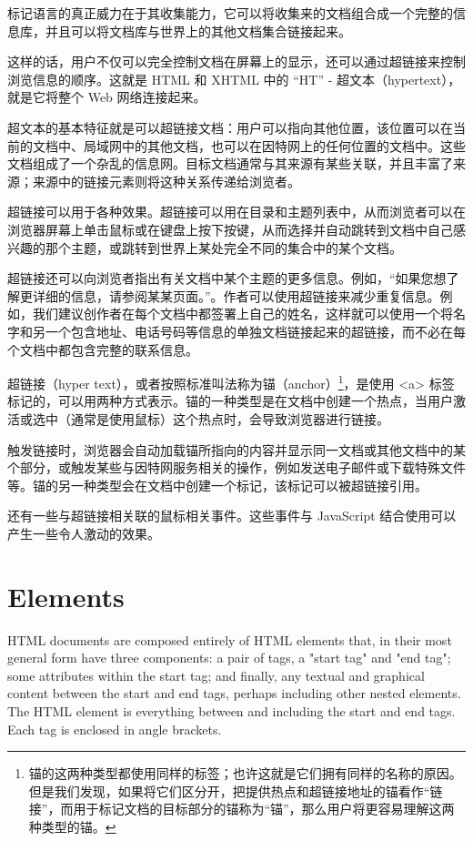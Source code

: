 标记语言的真正威力在于其收集能力，它可以将收集来的文档组合成一个完整的信息库，并且可以将文档库与世界上的其他文档集合链接起来。

这样的话，用户不仅可以完全控制文档在屏幕上的显示，还可以通过超链接来控制浏览信息的顺序。这就是 HTML 和 XHTML 中的 “HT” - 超文本（hypertext），就是它将整个 Web 网络连接起来。

超文本的基本特征就是可以超链接文档：用户可以指向其他位置，该位置可以在当前的文档中、局域网中的其他文档，也可以在因特网上的任何位置的文档中。这些文档组成了一个杂乱的信息网。目标文档通常与其来源有某些关联，并且丰富了来源；来源中的链接元素则将这种关系传递给浏览者。

超链接可以用于各种效果。超链接可以用在目录和主题列表中，从而浏览者可以在浏览器屏幕上单击鼠标或在键盘上按下按键，从而选择并自动跳转到文档中自己感兴趣的那个主题，或跳转到世界上某处完全不同的集合中的某个文档。

超链接还可以向浏览者指出有关文档中某个主题的更多信息。例如，“如果您想了解更详细的信息，请参阅某某页面。”。作者可以使用超链接来减少重复信息。例如，我们建议创作者在每个文档中都签署上自己的姓名，这样就可以使用一个将名字和另一个包含地址、电话号码等信息的单独文档链接起来的超链接，而不必在每个文档中都包含完整的联系信息。

超链接（hyper text），或者按照标准叫法称为锚（anchor）\footnote{锚的这两种类型都使用同样的标签；也许这就是它们拥有同样的名称的原因。但是我们发现，如果将它们区分开，把提供热点和超链接地址的锚看作“链接”，而用于标记文档的目标部分的锚称为“锚”，那么用户将更容易理解这两种类型的锚。}，是使用 <a> 标签标记的，可以用两种方式表示。锚的一种类型是在文档中创建一个热点，当用户激活或选中（通常是使用鼠标）这个热点时，会导致浏览器进行链接。

触发链接时，浏览器会自动加载锚所指向的内容并显示同一文档或其他文档中的某个部分，或触发某些与因特网服务相关的操作，例如发送电子邮件或下载特殊文件等。锚的另一种类型会在文档中创建一个标记，该标记可以被超链接引用。

还有一些与超链接相关联的鼠标相关事件。这些事件与 JavaScript 结合使用可以产生一些令人激动的效果。

\section{Elements}


HTML documents are composed entirely of HTML elements that, in their most general form have three components: a pair of tags, a "start tag" and "end tag"; some attributes within the start tag; and finally, any textual and graphical content between the start and end tags, perhaps including other nested elements. The HTML element is everything between and including the start and end tags. Each tag is enclosed in angle brackets.

